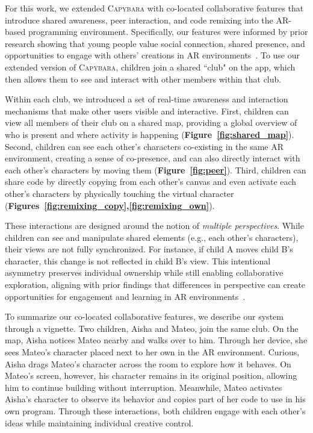 \documentclass[sigconf,nonacm]{acmart}
\newcommand{\capybara}{\textsc{Capybara}\xspace}
\begin{document}
For this work, we extended \capybara with co-located collaborative features that introduce shared awareness, peer interaction, and code remixing into the AR-based programming environment. Specifically, our features were informed by prior research showing that young people value social connection, shared presence, and opportunities to engage with others’ creations in AR environments~\cite{Liaqat25}. To use our extended version of \capybara, children join a shared ``club" on the app, which then allows them to see and interact with other members within that club.

Within each club, we introduced a set of real-time awareness and interaction mechanisms that make other users visible and interactive. First, children can view all members of their club on a shared map, providing a global overview of who is present and where activity is happening (\textbf{Figure~\ref{fig:shared_map}}). Second, children can see each other’s characters co-existing in the same AR environment, creating a sense of co-presence, and can also directly interact with each other's characters by moving them (\textbf{Figure~\ref{fig:peer}}). Third, children can share code by directly copying from each other's canvas and even activate each other's characters by physically touching the virtual character (\textbf{Figures~\ref{fig:remixing_copy},\ref{fig:remixing_own}}). 

These interactions are designed around the notion of \textit{multiple perspectives}. While children can see and manipulate shared elements (e.g., each other's characters), their views are not fully synchronized. For instance, if child A moves child B’s character, this change is not reflected in child B’s view. This intentional asymmetry preserves individual ownership while still enabling collaborative exploration, aligning with prior findings that differences in perspective can create opportunities for engagement and learning in AR environments~\cite{Liaqat25}.

To summarize our co-located collaborative features, we describe our system through a vignette. Two children, Aisha and Mateo, join the same club. On the map, Aisha notices Mateo nearby and walks over to him. Through her device, she sees Mateo’s character placed next to her own in the AR environment. Curious, Aisha drags Mateo’s character across the room to explore how it behaves. On Mateo’s screen, however, his character remains in its original position, allowing him to continue building without interruption. Meanwhile, Mateo activates Aisha’s character to observe its behavior and copies part of her code to use in his own program. Through these interactions, both children engage with each other’s ideas while maintaining individual creative control.
\end{document}
